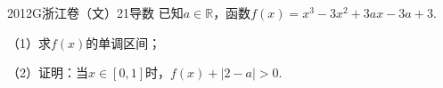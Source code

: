 
\begin{problem}{2012}{G}{浙江卷（文）}{21}{导数}
已知$a\in\mathbb{R}$，函数$f(x)=x^3-3x^2+3ax-3a+3$.

（1）求$f(x)$的单调区间；

（2）证明：当$x\in[0,1]$时，$f(x)+|2-a|>0$.
\end{problem}